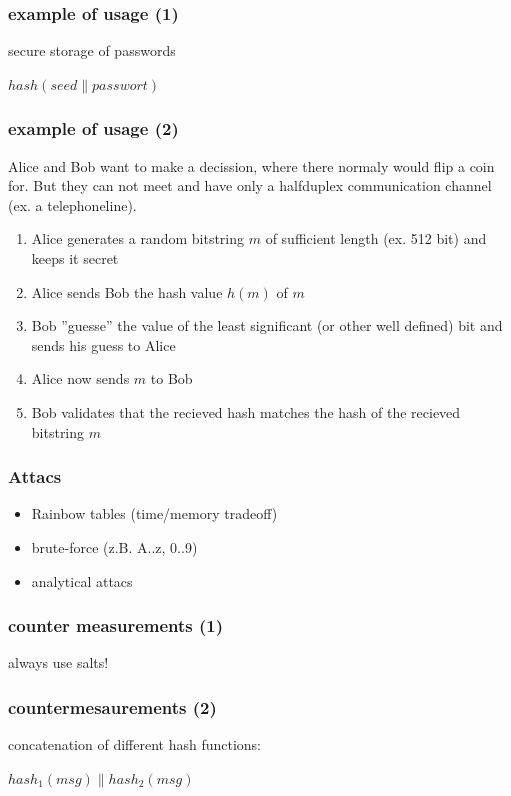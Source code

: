 \begin{frame}
\frametitle{example of usage (1)}
	secure storage of passwords
	\par
	\begin{center}$hash( seed \parallel passwort )$\end{center}
\end{frame}

\begin{frame}
	\frametitle{example of usage (2)}
	Alice and Bob want to make a decission, where there normaly would flip a coin for.
	But they can not meet and have only a halfduplex communication channel (ex. a telephoneline).
	\begin{enumerate}
		\item Alice generates a random bitstring $m$ of sufficient length (ex. 512 bit) and keeps it secret
		\item Alice sends Bob the hash value $h(m)$ of $m$
		\item Bob ''guesse'' the value of the least significant (or other well defined) bit and sends his guess to Alice
		\item Alice now sends $m$ to Bob
		\item Bob validates that the recieved hash matches the hash of the recieved bitstring $m$
	\end{enumerate}	
\end{frame}

\begin{frame}
\frametitle{Attacs}
	\begin{itemize}
		\item Rainbow tables (time/memory tradeoff)
		\item brute-force (z.B. A..z, 0..9)
		\item analytical attacs
	\end{itemize}
\end{frame}

\begin{frame}
\frametitle{counter measurements (1)}
	\large{always use salts!}
\end{frame}

\begin{frame}
\frametitle{countermesaurements (2)}
	concatenation of different hash functions:
	\par
	\begin{center}$hash_1 (msg) \parallel hash_2(msg)$\end{center}
\end{frame}

